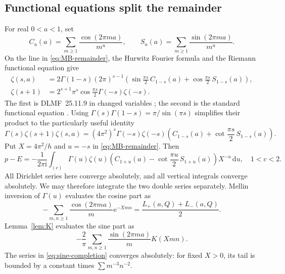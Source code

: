 \documentclass[11pt,a4paper]{article}
\numberwithin{equation}{section}
\theoremstyle{definition}
\theoremstyle{remark}\newtheorem{remark}[theorem]{Remark}
\newcommand{\ii}{\mathrm i}\newcommand{\e}{\mathrm e}
\newcommand{\dd}{\,\mathrm d}\newcommand{\id}{\operatorname{id}}
\begin{document}
\subsection{Functional equations split the remainder}
For real $0<a<1$, set
\[
 C_u(a)=\sum_{m\ge1}\frac{\cos(2\pi ma)}{m^u},\qquad
 S_u(a)=\sum_{m\ge1}\frac{\sin(2\pi ma)}{m^u}.
\]
On the line in \eqref{eq:MB-remainder}, the Hurwitz Fourier formula and
the Riemann functional equation give
\begin{align}
 \zeta(s,a)&=2\Gamma(1-s)(2\pi)^{s-1}
 \left(\sin\frac{\pi s}{2}\,C_{1-s}(a)
             +\cos\frac{\pi s}{2}\,S_{1-s}(a)\right),\label{eq:hurwitzFE}\\
 \zeta(s+1)&=2^{s+1}\pi^s\cos\frac{\pi s}{2}
                          \Gamma(-s)\zeta(-s).\label{eq:riemannFE}
\end{align}
The first is DLMF~25.11.9 in changed variables \cite{dlmfzeta}; the
second is the standard functional equation \cite{dlmfriemann}.
Using $\Gamma(s)\Gamma(1-s)=\pi/\sin(\pi s)$ simplifies their product
to the particularly useful identity
\begin{equation}\label{eq:FE-product}
 \Gamma(s)\zeta(s+1)\zeta(s,a)
 =(4\pi^2)^s\Gamma(-s)\zeta(-s)
 \left(C_{1-s}(a)+\cot\frac{\pi s}{2}\,S_{1-s}(a)\right).
\end{equation}
Put $X=4\pi^2/h$ and $u=-s$ in \eqref{eq:MB-remainder}. Then
\begin{equation}\label{eq:MB-dual}
 p-E=-\frac1{2\pi\ii}\int_{(c)}
 \Gamma(u)\zeta(u)
 \left(C_{1+u}(a)-\cot\frac{\pi u}{2}\,S_{1+u}(a)\right)
 X^{-u}\dd u,\quad1<c<2.
\end{equation}
All Dirichlet series here converge absolutely, and all vertical
integrals converge absolutely. We may therefore integrate the two
double series separately. Mellin inversion of $\Gamma(u)$ evaluates
the cosine part as
\begin{equation}\label{eq:cos-completion}
 -\sum_{m,n\ge1}\frac{\cos(2\pi ma)}m\e^{-Xmn}
                    =\frac{L_+(a,Q)+L_-(a,Q)}2.
\end{equation}
Lemma~\ref{lem:K} evaluates the sine part as
\begin{equation}\label{eq:sine-completion}
 -\frac2\pi\sum_{m,n\ge1}\frac{\sin(2\pi ma)}m K(Xmn).
\end{equation}
The series in \eqref{eq:sine-completion} converges absolutely: for fixed
$X>0$, its tail is bounded by a constant times
$\sum m^{-3}n^{-2}$.
\end{document}
